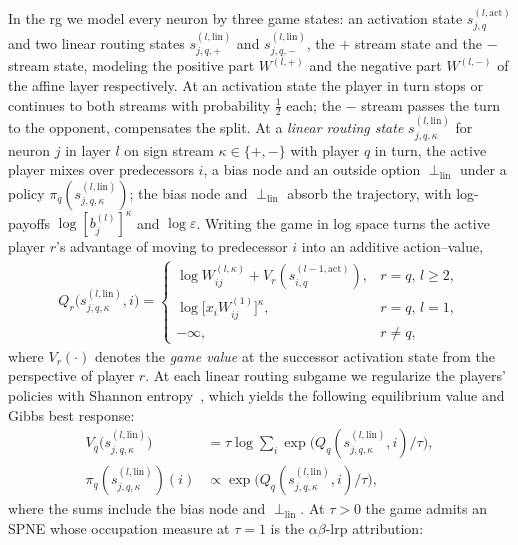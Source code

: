 In the \ac{rg} we model every neuron by three game states: an activation state
$s^{(l,\mathrm{act})}_{j,q}$ and two linear routing states $s^{(l,\mathrm{lin})}_{j,q,+}$ and
$s^{(l,\mathrm{lin})}_{j,q,-}$, the $+$ stream state and the $-$ stream state, modeling the
positive part $W^{(l,+)}$ and the negative part $W^{(l,-)}$ of the affine layer respectively. At an
activation state the player in turn stops or continues to both streams with probability $\tfrac12$
each; the $-$ stream passes the turn to the opponent, 
compensates the split.
At a \emph{linear routing state} $s^{(l,\mathrm{lin})}_{j,q,\kappa}$ for neuron $j$ in layer $l$ on
sign stream $\kappa \in \{+,-\}$ with player $q$ in turn, the active player mixes over predecessors
$i$, a bias node and an outside option $\perp_{\mathrm{lin}}$ under a policy
$\pi_{q}(s_{j,q,\kappa}^{(l,\text{lin})})$; the bias node and $\perp_{\mathrm{lin}}$ absorb the
trajectory, with log-payoffs $\log[b^{(l)}_j]^\kappa$ and $\log\varepsilon$.
Writing the game in log space turns the active player $r$'s advantage of moving to predecessor $i$
into an additive action--value,
\begin{align}\label{ptnb:eq:q-value}
    Q_r\bigl(s^{(l,\mathrm{lin})}_{j,q,\kappa}, i\bigr) = \begin{cases} \log W_{ij}^{(l,\kappa)} {+} V_r(s^{(l-1,\mathrm{act})}_{i,q}), & r{=}q,\, l{\ge}2,\\[0.2em] \log \bigl[x_i W_{ij}^{(1)}\bigr]^{\kappa}, & r{=}q,\, l{=}1, \\
        -\infty, & r \neq q,
    \end{cases}
\end{align}
where $V_r(\cdot)$ denotes the \emph{game value} at the successor activation state from the
perspective of player $r$. At each linear routing subgame we regularize the players' policies with
Shannon entropy~\parencite{Geist2019regularized}, which yields the following equilibrium value and
Gibbs best response:
\begin{align}
    V_q\!\bigl(s^{(l,\mathrm{lin})}_{j,q,\kappa}\bigr) &= \tau \log \textstyle\sum_i
    \exp\!\bigl(Q_q(s^{(l,\mathrm{lin})}_{j,q,\kappa}, i)/\tau\bigr), \label{ptnb:eq:soft-bellman}\\
    \pi_{q}(s_{j,q,\kappa}^{(l,\text{lin})})(i) &\propto
    \exp\!\bigl(Q_q(s^{(l,\mathrm{lin})}_{j,q,\kappa}, i)/\tau\bigr), \label{ptnb:eq:gibbs-policy}
\end{align}
where the sums include the bias node and $\perp_{\mathrm{lin}}$. At $\tau>0$ the game admits an
SPNE whose occupation measure at $\tau=1$ is the $\alpha\beta$-\ac{lrp} attribution:

